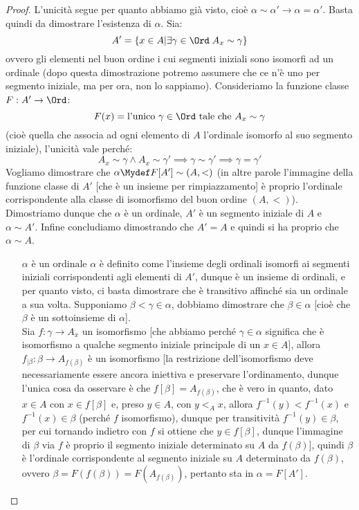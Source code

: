 \documentclass[11pt]{scrartcl}
\begin{document}
\begin{proof}
	L'unicità segue per quanto abbiamo già visto, cioè $\alpha \sim \alpha' \rightarrow \alpha = \alpha'$. Basta quindi da dimostrare l'esistenza di $\alpha$. Sia:
	\[ A' = \{x \in A | \exists \gamma \in \Ord \; A_x \sim \gamma\}
		\]
	ovvero gli elementi nel buon ordine i cui segmenti iniziali sono isomorfi ad un ordinale (dopo questa dimostrazione potremo assumere che ce n'è uno per segmento iniziale, ma per ora, non lo sappiamo).
	Consideriamo la funzione classe $F : A' \rightarrow \Ord$:
	\[ F(x) = \text{l'unico $\gamma \in \Ord$ tale che $A_x \sim \gamma$}
		\]
	(cioè quella che associa ad ogni elemento di $A$ l'ordinale isomorfo al suo segmento iniziale), l'unicità vale perché:
	\[ A_x \sim \gamma \land A_x \sim \gamma' \implies \gamma \sim \gamma' \implies \gamma = \gamma'
		\]
	Vogliamo dimostrare che $\alpha\Mydef F[A'] \sim (A,<)$ (in altre parole l'immagine della funzione classe di $A'$ [che è un insieme per rimpiazzamento] è proprio l'ordinale corrispondente alla classe di isomorfismo del buon ordine $(A,<)$).\\
	Dimostriamo dunque che $\alpha$ è un ordinale, $A'$ è un segmento iniziale di $A$ e $\alpha \sim A'$. Infine concludiamo dimostrando che $A' = A$ e quindi si ha proprio che $\alpha \sim A$.
	\begin{itemize}
		\item[$\boxed{\text{$\alpha$ è un ordinale}}$] $\alpha$ è definito come l'insieme degli ordinali isomorfi ai segmenti iniziali corrispondenti agli elementi di $A'$, dunque è un insieme di ordinali, e per quanto visto, ci basta dimostrare che è transitivo affinché sia un ordinale a sua volta.
		Supponiamo $\beta < \gamma \in \alpha$, dobbiamo dimostrare che $\beta \in \alpha$ [cioè che $\beta$ è un sottoinsieme di $\alpha$].\\ Sia $f : \gamma \rightarrow A_x$ un isomorfismo [che abbiamo perché $\gamma \in \alpha$ significa che è isomorfismo a qualche segmento iniziale principale di un $x \in A$], allora
		$f_{|\beta} : \beta \rightarrow A_{f(\beta)}$ è un isomorfismo [la restrizione dell'isomorfismo deve necessariamente essere ancora iniettiva e preservare l'ordinamento, dunque l'unica cosa da osservare è che $f[\beta] = A_{f(\beta)}$, che è vero in quanto, dato $x \in A$ con $x \in f[\beta]$ e,
		preso $y \in A$, con $y <_A x$, allora $f^{-1}(y) < f^{-1}(x)$ e $f^{-1}(x) \in \beta$ (perché $f$ isomorfismo), dunque per transitività $f^{-1}(y) \in \beta$, per cui
		tornando indietro con $f$ si ottiene che $y \in f[\beta]$, dunque l'immagine di $\beta$ via $f$ è proprio il segmento iniziale determinato su $A$ da $f(\beta)$], quindi $\beta$ è l'ordinale corrispondente al segmento iniziale su $A$ determinato da $f(\beta)$, ovvero $\beta = F(f(\beta)) = F(A_{f(\beta)})$, pertanto sta in $\alpha = F[A']$.

\end{itemize}
\end{proof}
\end{document}
